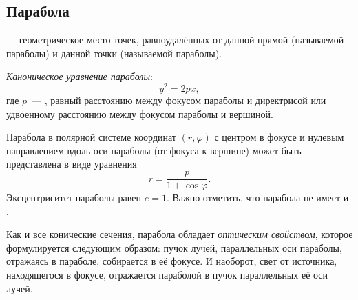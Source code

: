 \subsection{Парабола}
{\bfseries {}} --- геометрическое место точек, равноудалённых от данной прямой (называемой  параболы) и данной точки (называемой  параболы).

{\itshape Каноническое уравнение параболы}:
\begin{equation}
y^2=2px,
\end{equation}
где $p$~--- , равный расстоянию между фокусом параболы и директрисой или удвоенному расстоянию между фокусом параболы и вершиной.

Парабола в полярной системе координат $(r,\varphi)$ с центром в фокусе и нулевым направлением вдоль оси параболы (от фокуса к вершине) может быть представлена в виде уравнения
\begin{equation}
r = \frac{p}{1 + \cos\varphi}.
\end{equation}
Эксцентриситет параболы равен $e=1$. Важно отметить, что парабола не имеет  и .

Как и все конические сечения, парабола обладает \textit{оптическим свойством}, которое формулируется следующим образом: пучок лучей, параллельных оси параболы, отражаясь в параболе, собирается в её фокусе. И наоборот, свет от источника, находящегося в фокусе, отражается параболой в пучок параллельных её оси лучей.
